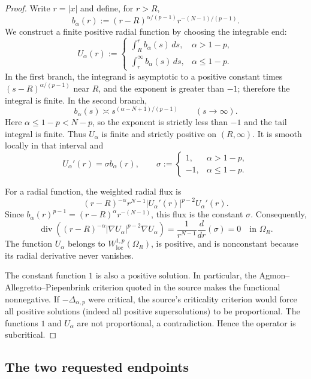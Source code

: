 \documentclass[11pt]{article}
\newcommand{\Om}{\Omega_R}
\begin{document}
\begin{proof}
Write $r=|x|$ and define, for $r>R$,
\[
 b_\alpha(r):=(r-R)^{\alpha/(p-1)}
                   r^{-(N-1)/(p-1)}.
\]
We construct a finite positive radial function by choosing the integrable end:
\[
 U_\alpha(r):=
 \begin{cases}
 \displaystyle\int_R^r b_\alpha(s)\,ds,
       &\alpha>1-p,\\[2.2ex]
 \displaystyle\int_r^\infty b_\alpha(s)\,ds,
       &\alpha\le 1-p.
 \end{cases}\tag{1}
\]
In the first branch, the integrand is asymptotic to a positive constant times
$(s-R)^{\alpha/(p-1)}$ near $R$, and the exponent is greater than $-1$;
therefore the integral is finite.  In the second branch,
\[
 b_\alpha(s)\asymp
 s^{(\alpha-N+1)/(p-1)}\qquad(s\to\infty).
\]
Here $\alpha\le1-p<N-p$, so the exponent is strictly less than $-1$ and the
tail integral is finite.  Thus $U_\alpha$ is finite and strictly positive on
$(R,\infty)$.  It is smooth locally in that interval and
\[
 U_\alpha'(r)=\sigma b_\alpha(r),
 \qquad
 \sigma:=
 \begin{cases}1,&\alpha>1-p,\\-1,&\alpha\le1-p.\end{cases}
\]

For a radial function, the weighted radial flux is
\[
 (r-R)^{-\alpha}r^{N-1}
 |U_\alpha'(r)|^{p-2}U_\alpha'(r).
\]
Since $b_\alpha(r)^{p-1}=(r-R)^\alpha r^{-(N-1)}$,
this flux is the constant $\sigma$.  Consequently,
\[
 \operatorname{div}\!\left(
 (r-R)^{-\alpha}|\nabla U_\alpha|^{p-2}
 \nabla U_\alpha\right)
 =\frac1{r^{N-1}}\frac{d}{dr}(\sigma)=0
 \quad\text{in }\Om.\tag{2}
\]
The function $U_\alpha$ belongs to $W^{1,p}_{\mathrm{loc}}(\Om)$, is positive,
and is nonconstant because its radial derivative never vanishes.

The constant function $1$ is also a positive solution.  In particular, the
Agmon--Allegretto--Piepenbrink criterion quoted in the source makes the
functional nonnegative.  If $-\Delta_{\alpha,p}$ were critical, the source's
criticality criterion would force all positive solutions (indeed all positive
supersolutions) to be proportional.  The functions $1$ and $U_\alpha$ are not
proportional, a contradiction.  Hence the operator is subcritical.
\end{proof}

\subsection*{The two requested endpoints}
\end{document}
